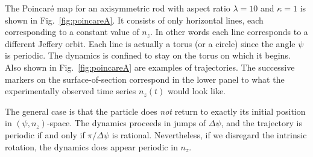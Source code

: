 \documentclass[thesis.tex]{subfiles}
\begin{document}
The Poincar\'e map for an axisymmetric rod with aspect ratio $\lambda=10$ and $\kappa=1$ is shown in Fig.~\ref{fig:poincareA}. It consists of only horizontal lines, each corresponding to a constant value of $n_z$. In other words each line corresponds to a different Jeffery orbit. Each line is actually a torus (or a circle) since the angle $\psi$ is periodic. The dynamics is confined to stay on the torus on which it begins. Also shown in Fig.~\ref{fig:poincareA} are examples of trajectories. The successive markers on the surface-of-section correspond in the lower panel to what the experimentally observed time series $n_z(t)$ would look like. 

The general case is that the particle does \emph{not} return to exactly its initial position in $(\psi, n_z)$-space. The dynamics proceeds in jumps of $\Delta \psi$, and the trajectory is periodic if and only if $\pi/\Delta \psi$ is rational. Nevertheless, if we disregard the intrinsic rotation, the dynamics does appear periodic in $n_z$.
\end{document}
